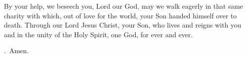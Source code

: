 \lettrine[lines=3]{B}{}y your help, we beseech you, Lord our God, 
may we walk eagerly in that same charity with which,
out of love for the world,
your Son handed himself over to death.
Through our Lord Jesus Christ, your Son,
who lives and reigns with you and in the unity of the Holy Spirit,
one God, for ever and ever.
\par \Rbar.~Amen.

